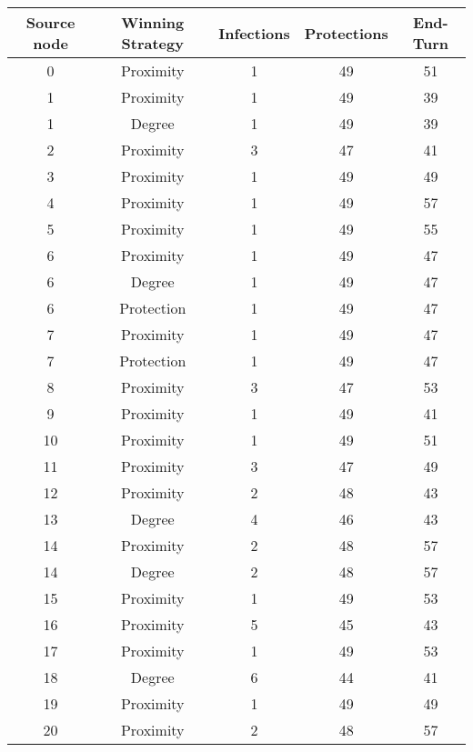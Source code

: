 \documentclass[results.tex]{subfiles}
\begin{document}
\begin{center}
  \begin{tabular}{| c || c | c | c | c |}
    \hline
    {\bfseries Source node} & {\bfseries Winning Strategy} & {\bfseries Infections} & {\bfseries Protections} & {\bfseries End-Turn} \\  %
    \hline\hline
    0 & Proximity & 1 & 49 & 51 \\ 
    \hline
    1 & Proximity & 1 & 49 & 39 \\ 
    \hline
    1 & Degree & 1 & 49 & 39 \\ 
    \hline
    2 & Proximity & 3 & 47 & 41 \\ 
    \hline
    3 & Proximity & 1 & 49 & 49 \\ 
    \hline
    4 & Proximity & 1 & 49 & 57 \\ 
    \hline
    5 & Proximity & 1 & 49 & 55 \\ 
    \hline
    6 & Proximity & 1 & 49 & 47 \\ 
    \hline
    6 & Degree & 1 & 49 & 47 \\ 
    \hline
    6 & Protection & 1 & 49 & 47 \\ 
    \hline
    7 & Proximity & 1 & 49 & 47 \\ 
    \hline
    7 & Protection & 1 & 49 & 47 \\ 
    \hline
    8 & Proximity & 3 & 47 & 53 \\ 
    \hline
    9 & Proximity & 1 & 49 & 41 \\ 
    \hline
    10 & Proximity & 1 & 49 & 51 \\ 
    \hline
    11 & Proximity & 3 & 47 & 49 \\ 
    \hline
    12 & Proximity & 2 & 48 & 43 \\ 
    \hline
    13 & Degree & 4 & 46 & 43 \\ 
    \hline
    14 & Proximity & 2 & 48 & 57 \\ 
    \hline
    14 & Degree & 2 & 48 & 57 \\ 
    \hline
    15 & Proximity & 1 & 49 & 53 \\ 
    \hline
    16 & Proximity & 5 & 45 & 43 \\ 
    \hline
    17 & Proximity & 1 & 49 & 53 \\ 
    \hline
    18 & Degree & 6 & 44 & 41 \\ 
    \hline
    19 & Proximity & 1 & 49 & 49 \\ 
    \hline
    20 & Proximity & 2 & 48 & 57 \\ 

\end{tabular}
\end{center}
\end{document}

